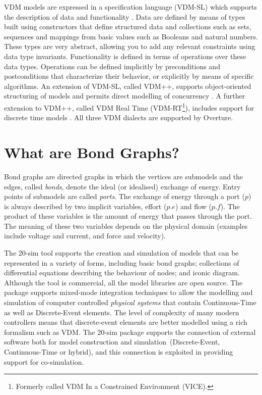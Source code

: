 \documentclass{crescendorepchap}
\begin{document}
VDM models are expressed in a specification language (VDM-SL) which
supports the description of data and functionality
\cite{ISOVDM96a,Fitzgerald&98b,Fitzgerald&09}. Data are defined by
means of types built using constructors that define structured data
and collections such as sets, sequences and mappings from basic values
such as Booleans and natural numbers. These types are very abstract,
allowing you to add any relevant constraints using data type
invariants. Functionality is defined in terms of operations over these
data types. Operations can be defined implicitly by preconditions and
postconditions that characterize their behavior, or explicitly by
means of specific algorithms. An extension of VDM-SL, called VDM++,
supports object-oriented structuring of models and permits direct
modelling of concurrency \cite{Fitzgerald&05}. A further extension
to VDM++, called VDM Real Time (VDM-RT\footnote{Formerly called VDM In a
Constrained Environment (VICE).}), includes support for discrete
time models \cite{Mukherjee&00,Verhoef&06b}. All
three VDM dialects are supported by Overture.

\section{What are Bond Graphs?}\label{sec:bond}

Bond graphs are directed graphs in which the vertices are submodels
and the edges, called \textit{bonds}, denote the ideal (or idealised)
exchange of energy. Entry points of submodels are called
\textit{ports}. The exchange of energy through a port ($p$) is always
described by two implicit variables, effort ($p.e$) and flow
($p.f$). The product of these variables is the amount of energy that
passes through the port. The meaning of these two variables depends on
the physical domain (examples include voltage and current, and force
and velocity).

The 20-sim tool supports the creation and simulation of models that
can be represented in a variety of forms, including basic bond graphs;
collections of differential equations describing the behaviour of
nodes; and iconic diagram. Although the tool is commercial, all the
model libraries are open source. The package supports mixed-mode
integration techniques to allow the modelling and simulation of
computer controlled \textit{physical systems} that contain
Continuous-Time as well as Discrete-Event elements. The level of
complexity of many modern controllers means that discrete-event
elements are better modelled using a rich formalism such as VDM. The
20-sim package supports the connection of external software both for
model construction and simulation~(Discrete-Event, Continuous-Time or
hybrid), and this connection is exploited in providing support for
co-simulation.
\end{document}
